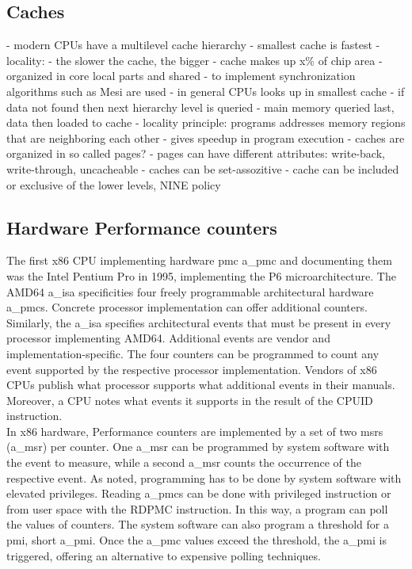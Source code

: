 \subsection{Caches}
\label{sec:state:technical:caches}
- modern CPUs have a multilevel cache hierarchy
- smallest cache is fastest
- locality:
- the slower the cache, the bigger
- cache makes up x\% of chip area
- organized in core local parts and shared
- to implement synchronization algorithms such as Mesi are used
- in general CPUs looks up in smallest cache
- if data not found then next hierarchy level is queried
- main memory queried last, data then loaded to cache
- locality principle: programs addresses memory regions that are neighboring each other
- gives speedup in program execution
- caches are organized in so called pages?
- pages can have different attributes: write-back, write-through, uncacheable
- caches can be set-assozitive
- cache can be included or exclusive of the lower levels, NINE policy

\subsection{Hardware Performance counters}
\label{sec:state:technical:hpc}
The first x86 CPU implementing hardware \gls{pmc} \acrshort{a_pmc} and
documenting them was the Intel Pentium Pro in 1995, implementing the P6
microarchitecture.\cite{intel_sdm} The AMD64 \acrshort{a_isa} specificities four
freely programmable architectural hardware \acrshort{a_pmc}s.\cite{amd_manual}
Concrete processor implementation can offer additional counters. Similarly, the
\acrshort{a_isa} specifies architectural events that must be present in every
processor implementing AMD64. Additional events are vendor and
implementation-specific. The four counters can be programmed to count any event
supported by the respective processor implementation. Vendors of x86 CPUs
publish what processor supports what additional events in their manuals.
Moreover, a CPU notes what events it supports in the result of the \gls{CPUID}
instruction. \\

In x86 hardware, Performance counters are implemented by a set of two \gls{msr}s
(\acrshort{a_msr}) per counter. One \acrshort{a_msr} can be programmed by system
software with the event to measure, while a second \acrshort{a_msr} counts the
occurrence of
the respective event. As noted, programming has to be done by system software
with elevated privileges. Reading \acrlong{a_pmc}s can be done
with privileged instruction or from user space with the RDPMC instruction.
In this way, a program can poll the values of counters. The system software
can also program a threshold for a \gls{pmi}, short \acrshort{a_pmi}.
Once the \acrshort{a_pmc} values exceed the threshold, the \acrshort{a_pmi} is
triggered, offering an alternative to expensive polling techniques.\\

